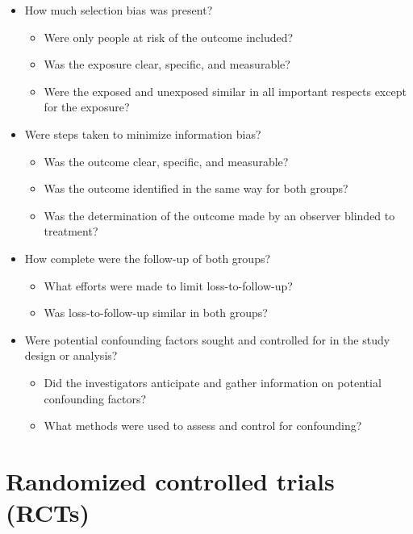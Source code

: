 \documentclass[
]{book}
\providecommand{\tightlist}{%
  \setlength{\itemsep}{0pt}\setlength{\parskip}{0pt}}
\begin{document}
\begin{itemize}
\tightlist
\item
  How much selection bias was present?

  \begin{itemize}
  \tightlist
  \item
    Were only people at risk of the outcome included?
  \item
    Was the exposure clear, specific, and measurable?
  \item
    Were the exposed and unexposed similar in all important respects except for the exposure?
  \end{itemize}
\item
  Were steps taken to minimize information bias?

  \begin{itemize}
  \tightlist
  \item
    Was the outcome clear, specific, and measurable?
  \item
    Was the outcome identified in the same way for both groups?
  \item
    Was the determination of the outcome made by an observer blinded to treatment?
  \end{itemize}
\item
  How complete were the follow-up of both groups?

  \begin{itemize}
  \tightlist
  \item
    What efforts were made to limit loss-to-follow-up?
  \item
    Was loss-to-follow-up similar in both groups?
  \end{itemize}
\item
  Were potential confounding factors sought and controlled for in the study design or analysis?

  \begin{itemize}
  \tightlist
  \item
    Did the investigators anticipate and gather information on potential confounding factors?
  \item
    What methods were used to assess and control for confounding?
  \end{itemize}
\end{itemize}

\hypertarget{randomized-controlled-trials-rcts}{%
\section{Randomized controlled trials (RCTs)}\label{randomized-controlled-trials-rcts}}
\end{document}
